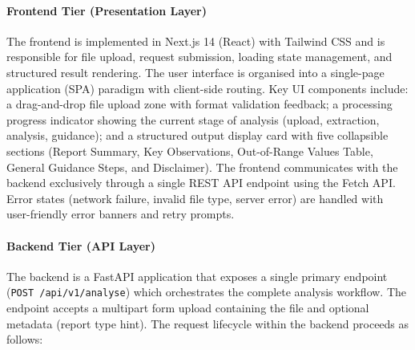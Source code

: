 \documentclass[12pt,a4paper]{report}
\begin{document}
\paragraph{Frontend Tier (Presentation Layer)}
The frontend is implemented in Next.js 14 (React) with Tailwind CSS and is responsible for file upload, request submission, loading state management, and structured result rendering. The user interface is organised into a single-page application (SPA) paradigm with client-side routing. Key UI components include: a drag-and-drop file upload zone with format validation feedback; a processing progress indicator showing the current stage of analysis (upload, extraction, analysis, guidance); and a structured output display card with five collapsible sections (Report Summary, Key Observations, Out-of-Range Values Table, General Guidance Steps, and Disclaimer). The frontend communicates with the backend exclusively through a single REST API endpoint using the Fetch API. Error states (network failure, invalid file type, server error) are handled with user-friendly error banners and retry prompts.

\paragraph{Backend Tier (API Layer)}
The backend is a FastAPI application that exposes a single primary endpoint (\texttt{POST /api/v1/analyse}) which orchestrates the complete analysis workflow. The endpoint accepts a multipart form upload containing the file and optional metadata (report type hint). The request lifecycle within the backend proceeds as follows:
\end{document}
